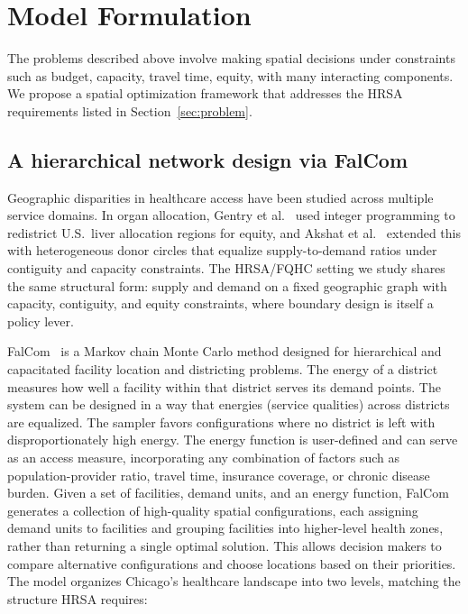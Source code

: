 \documentclass[11pt]{article}
\begin{document}
\section{Model Formulation}\label{sec:model}

The problems described above involve making spatial decisions under constraints such as budget, 
capacity, travel time, equity, with many interacting components. We propose a spatial 
optimization framework that addresses the HRSA
requirements listed in Section~\ref{sec:problem}.


\subsection{A hierarchical network design via FalCom}

Geographic disparities in healthcare access have been studied across multiple service domains. In organ allocation, Gentry et al.~\cite{gentry2015gerrymandering} used integer programming to redistrict U.S.\ liver allocation regions for equity, and Akshat et al.~\cite{akshat2024heterogeneous} extended this with heterogeneous donor circles that equalize supply-to-demand ratios under contiguity and capacity constraints. The HRSA/FQHC setting we study shares the same structural form: supply and demand on a fixed geographic graph with capacity, contiguity, and equity constraints, where boundary design is itself a policy lever.

FalCom~\cite{kirtisoglu2026falcom} is a Markov chain Monte Carlo
method designed for hierarchical and capacitated facility location
and districting problems. The energy of a district measures how well a facility
within that district serves its demand points. The system can be designed in a way that energies (service qualities) across districts are equalized.
The sampler favors configurations where no district is
left with disproportionately high energy. The energy function is user-defined and can serve as
an access measure, incorporating any combination of
factors such as population-provider ratio, travel time,
insurance coverage, or chronic disease burden. Given a set of facilities, demand units, and an energy 
function, FalCom generates a collection of high-quality spatial 
configurations, each assigning demand units to facilities and grouping
facilities into higher-level health zones, rather than returning a single 
optimal solution. This allows decision makers to compare alternative 
configurations and choose locations based on their priorities. The model organizes 
Chicago's healthcare landscape into two levels, matching the structure HRSA requires:
\end{document}
